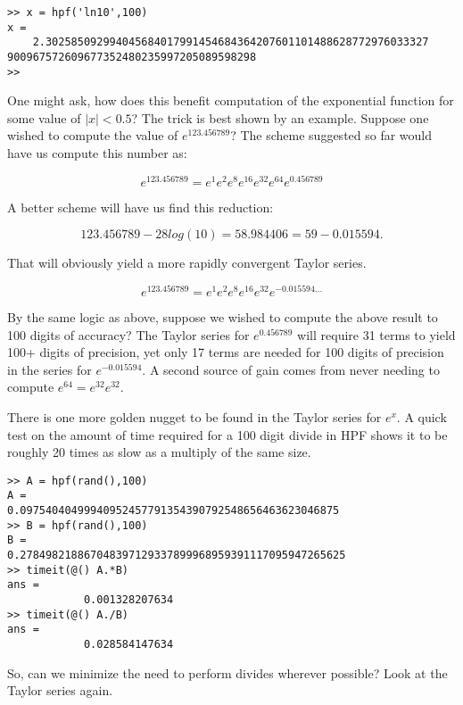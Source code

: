 \documentclass[a4paper,12pt]{article}
\begin{document}
\begin{lstlisting}
>> x = hpf('ln10',100)
x =
    2.302585092994045684017991454684364207601101488628772976033327
900967572609677352480235997205089598298
>>
\end{lstlisting}

One might ask, how does this benefit computation of the exponential function for some value of $|x| < 0.5$? The trick is best shown by an example. Suppose one wished to compute the value of $e^{123.456789}$? The scheme suggested so far would have us compute this number as:

\begin{equation}
e^{123.456789} = e^1e^2e^8 e^{16} e^{32} e^{64}e^{0.456789}
\end{equation}

A better scheme will have us find this reduction:

\begin{equation}
123.456789 - 28 log(10) = 58.984406 = 59 - 0.015594.
\end{equation}

That will obviously yield a more rapidly convergent Taylor series.

\begin{equation}
e^{123.456789} = e^1e^2e^8 e^{16} e^{32}e^{-0.015594\ldots}
\end{equation}

By the same logic as above, suppose we wished to compute the above result to 100 digits of accuracy? The Taylor series for $e^{0.456789}$ will require 31 terms to yield 100+ digits of precision, yet only 17 terms are needed for 100 digits of precision in the series for $e^{-0.015594}$. A second source of gain comes from never needing to compute $e^{64}=e^{32}e^{32}$.

There is one more golden nugget to be found in the Taylor series for $e^x$. A quick test on the amount of time required for a 100 digit divide in HPF shows it to be roughly 20 times as slow as a multiply of the same size.

\begin{lstlisting}
>> A = hpf(rand(),100)
A =
0.09754040499940952457791354390792548656463623046875
>> B = hpf(rand(),100)
B =
0.278498218867048397129337899968959391117095947265625
>> timeit(@() A.*B)
ans =
            0.001328207634
>> timeit(@() A./B)
ans =
            0.028584147634
\end{lstlisting}

So, can we minimize the need to perform divides wherever possible? Look at the Taylor series again.
\end{document}
